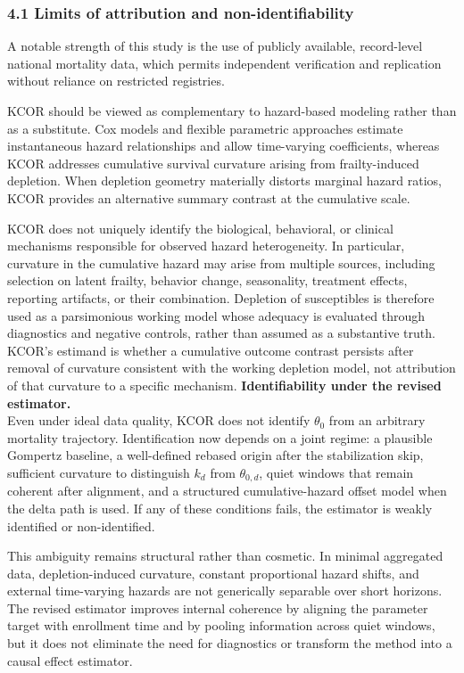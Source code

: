 \documentclass[
]{article}
\begin{document}
\subsubsection{4.1 Limits of attribution and
non-identifiability}\label{limits-of-attribution-and-non-identifiability}

A notable strength of this study is the use of publicly available,
record-level national mortality data, which permits independent
verification and replication without reliance on restricted registries.

KCOR should be viewed as complementary to hazard-based modeling rather
than as a substitute. Cox models and flexible parametric approaches
estimate instantaneous hazard relationships and allow time-varying
coefficients, whereas KCOR addresses cumulative survival curvature
arising from frailty-induced depletion. When depletion geometry
materially distorts marginal hazard ratios, KCOR provides an alternative
summary contrast at the cumulative scale.

KCOR does not uniquely identify the biological, behavioral, or clinical
mechanisms responsible for observed hazard heterogeneity. In particular,
curvature in the cumulative hazard may arise from multiple sources,
including selection on latent frailty, behavior change, seasonality,
treatment effects, reporting artifacts, or their combination. Depletion
of susceptibles is therefore used as a parsimonious working model whose
adequacy is evaluated through diagnostics and negative controls, rather
than assumed as a substantive truth. KCOR's estimand is whether a
cumulative outcome contrast persists after removal of curvature
consistent with the working depletion model, not attribution of that
curvature to a specific mechanism. \textbf{Identifiability under the
revised estimator.}\\
Even under ideal data quality, KCOR does not identify \(\theta_0\) from
an arbitrary mortality trajectory. Identification now depends on a joint
regime: a plausible Gompertz baseline, a well-defined rebased origin
after the stabilization skip, sufficient curvature to distinguish
\(k_d\) from \(\theta_{0,d}\), quiet windows that remain coherent after
alignment, and a structured cumulative-hazard offset model when the
delta path is used. If any of these conditions fails, the estimator is
weakly identified or non-identified.

This ambiguity remains structural rather than cosmetic. In minimal
aggregated data, depletion-induced curvature, constant proportional
hazard shifts, and external time-varying hazards are not generically
separable over short horizons. The revised estimator improves internal
coherence by aligning the parameter target with enrollment time and by
pooling information across quiet windows, but it does not eliminate the
need for diagnostics or transform the method into a causal effect
estimator.
\end{document}
